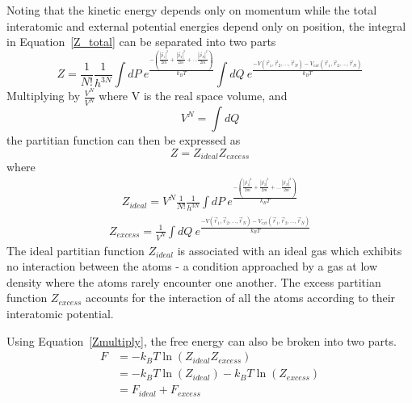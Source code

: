 \documentclass[double,12pt]{beavtex}
\begin{document}
Noting that the kinetic energy depends only on momentum while the total 
interatomic and external potential energies depend only on position, 
the integral in Equation~\ref{Z_total} can be separated into two parts 
\begin{equation}{Z=\frac{1}{N!}\frac{1}{h^{3N}}\int{dP}~e^\frac{-\left(\frac{|\vec{p}_1|^2}{2m}+\frac{|\vec{p}_2|^2}{2m}+...\frac{|\vec{p}_N|^2}{2m}\right)}{k_BT}\int{dQ}~e^\frac{-V(\vec{r}_1,\vec{r}_2,{...},\vec{r}_N)-V_{ext}(\vec{r}_1,\vec{r}_2,{...},\vec{r}_N)}{k_BT}}\end{equation}  
Multiplying by $\frac{V^N}{V^N}$ where V is the real space volume, and 
\begin{equation}V^N=\int dQ\end{equation} 
the partitian function can then be expressed as
\begin{equation}\label{Zmultiply}{Z=Z_{ideal}Z_{excess}}\end{equation}
where
\begin{align} \label{eq:Zideal}
    Z_{ideal}=V^N\frac{1}{N!}\frac{1}{h^{3N}}\int{dP}~e^\frac{-\left(\frac{|\vec{p}_1|^2}{2m}+ \frac{|\vec{p}_2|^2}{2m}+...\frac{|\vec{p}_N|^2}{2m}\right)}{k_BT}
\end{align}
\begin{align} \label{eq:Zexcess}
    Z_{excess}=\frac{1}{V^N}\int{dQ}~e^\frac{-V(\vec{r}_1,\vec{r}_2,{...},\vec{r}_N)-V_{ext}(\vec{r}_1,\vec{r}_2,{...},\vec{r}_N )}{k_BT}
\end{align} 
The ideal partitian function $Z_{ideal}$ is associated with an ideal gas 
which exhibits no interaction between the atoms - a condition approached 
by a gas at low density where the atoms rarely encounter one another. 
The excess partitian function $Z_{excess}$ accounts for the interaction 
of all the atoms according to their interatomic potential. 

Using Equation~\ref{Zmultiply}, the free energy can also be broken into two parts.
\begin{align} \label{eq:Finparts}
     F &= -k_{B}T\ln(Z_{ideal}Z_{excess})  \\
       &= -k_{B}T\ln(Z_{ideal})-k_{B}T\ln(Z_{excess}) \\
       &= F_{ideal} + F_{excess}
\end{align}
\end{document}

